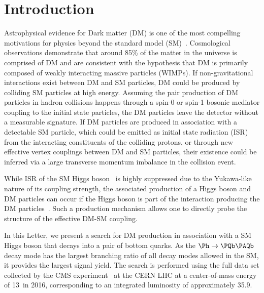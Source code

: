 \section{Introduction}

Astrophysical evidence for Dark matter (DM) is one of the most compelling motivations for
physics beyond the standard model
(SM)~\cite{dm1,dm2,dm3}. Cosmological observations demonstrate that
around 85\% of the matter in the universe is comprised of DM
\cite{planck} and are consistent with the hypothesis that DM is primarily composed of
weakly interacting massive particles (WIMPs). If non-gravitational
interactions exist between DM and SM particles, DM could be produced
by colliding SM particles at high energy. Assuming the pair
production of DM particles in hadron collisions happens through a
spin-0 or spin-1 bosonic mediator coupling to the initial state particles, the DM particles leave the
detector without a measurable signature. If DM particles are produced in association with a detectable SM particle, which could be emitted
as initial state radiation (ISR) from the interacting constituents of the colliding protons, or through
new effective vertex couplings between DM and SM particles, their
existence could be inferred via a large transverse momentum imbalance in the collision event. 


While ISR of the SM Higgs boson~\cite{HiggsObs_ATLAS, HiggsObs_CMS, HiggsObs_CMS_Long} is highly suppressed due to the Yukawa-like nature of its coupling strength, 
the associated production of a Higgs boson and DM particles
can occur if the
Higgs boson is part of the interaction producing the DM particles~\cite{monoHiggs3,2HDM,PhysRevD.89.075017}.
Such a production mechanism allows one to directly probe the structure of the effective DM-SM coupling.

In this Letter, we  present a search for DM production in association
with a SM Higgs boson that decays into a pair of bottom quarks. As the 
$\Ph\rightarrow \bb$ decay mode has the largest branching ratio of all decay modes allowed in the SM, it provides the largest signal yield. The search is performed using the full data set collected by the CMS experiment~\cite{CMSdetector} at the CERN LHC at a center-of-mass energy of 13\TeV~in 2016, corresponding to an integrated luminosity of approximately 35.9\fbinv. 

